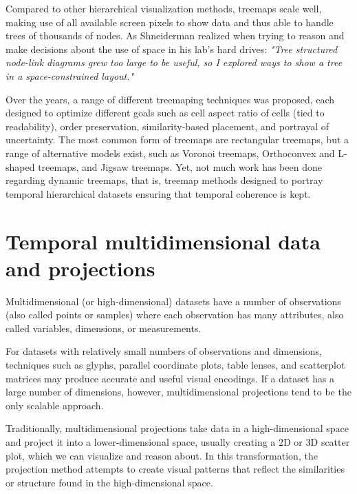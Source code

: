 Compared to other hierarchical visualization methods, treemaps scale well, making use of all available screen pixels to show data and thus able to handle trees of thousands of nodes. As Shneiderman realized when trying to reason and make decisions about the use of space in his lab's hard drives:
\textit{"Tree structured node-link diagrams grew too large to be useful, so I explored ways to show a tree in a space-constrained layout."}

Over the years, a range of different treemaping techniques was proposed, each designed to optimize different goals such as cell aspect ratio of cells (tied to readability), order preservation, similarity-based placement, and portrayal of uncertainty. The most common form of treemaps are rectangular treemaps, but a range of alternative models exist, such as Voronoi treemaps, Orthoconvex and L-shaped treemaps, and Jigsaw treemaps.
Yet, not much work has been done regarding dynamic treemaps, that is, treemap methods designed to portray temporal hierarchical datasets ensuring that temporal coherence is kept.


\section{Temporal multidimensional data and projections}

Multidimensional (or high-dimensional) datasets have a number of observations (also called points or samples) where each observation has many attributes, also called variables, dimensions, or measurements. 

For datasets with relatively small numbers of observations and dimensions, techniques such as glyphs, parallel coordinate plots, table lenses, and scatterplot matrices may produce accurate and useful visual encodings.  
If a dataset has a large number of dimensions, however, multidimensional projections tend to be the only scalable approach.  

Traditionally, multidimensional projections take data in a high-dimensional space and project it into a lower-dimensional space, usually creating a 2D or 3D scatter plot, which we can visualize and reason about. In this transformation, the projection method attempts to create visual patterns that reflect the similarities or structure found in the high-dimensional space.

